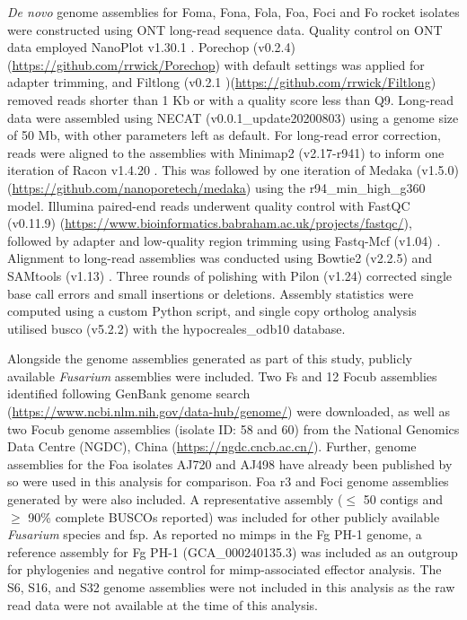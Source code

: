 \textit{De novo} genome assemblies for \ac{Foma}, \ac{Fona}, \ac{Fola}, \ac{Foa}, \ac{Foci} and \ac{Fo} rocket isolates were constructed using ONT long-read sequence data. Quality control on ONT data employed NanoPlot v1.30.1 \parencite{DeCoster2018}. Porechop (v0.2.4) (\href{https://github.com/rrwick/Porechop}{https://github.com/rrwic\-k/Porechop}) with default settings was applied for adapter trimming, and Filtlong (v0.2.1 )(\href{https://github.com/rrwick/Filtlong}{https://github.com/rrwick/Filtlong}) removed reads shorter than 1 Kb or with a quality score less than Q9. Long-read data were assembled using NECAT (v0.0.1\_update20200803) \parencite{Chen2021} using a genome size of 50 Mb, with other parameters left as default. For long-read error correction, reads were aligned to the assemblies with Minimap2 (v2.17-r941) \parencite{Li2018} to inform one iteration of Racon v1.4.20 \parencite{Vaser2017}. This was followed by one iteration of Medaka (v1.5.0) (\href{https://github.com/nanoporetech/medaka}{https://github.com/nanoporetech/medaka}) using the r94\_min\_high\_g360 model. Illumina paired-end reads underwent quality control with FastQC (v0.11.9) (\href{https://www.bioinformatics.babraham.ac.uk/projects/fastqc/}{https://www.bioinformatics.babraham.ac.uk/projects/fastqc/}), followed by adapter and low-quality region trimming using Fastq-Mcf (v1.04) \parencite{Aronesty2013}. Alignment to long-read assemblies was conducted using Bowtie2 (v2.2.5) \parencite{Langmead2012} and SAMtools (v1.13) \Parencite{Danecek2021}. Three rounds of polishing with Pilon (v1.24) \parencite{Walker2014} corrected single base call errors and small insertions or deletions. Assembly statistics were computed using a custom Python script, and single copy ortholog analysis utilised \ac{busco} (v5.2.2) \parencite{Simao2015} with the hypocreales\_odb10 database.

Alongside the genome assemblies generated as part of this study, publicly available \textit{Fusarium} assemblies were included. Two \ac{Fs} and 12 \ac{Focub} assemblies identified following GenBank genome search (\href{https://www.ncbi.nlm.nih.gov/data-hub/genome}{https://www.ncbi.nlm.nih.gov/data-hub/genome/}) were downloaded, as well as two \ac{Focub} genome assemblies (isolate ID: 58 and 60) from the National Genomics Data Centre (NGDC), China (\href{https://ngdc.cncb.ac.cn}{https://ngdc.cncb.ac.cn/}). Further, genome assemblies for the \ac{Foa} isolates AJ720 and AJ498 have already been published by \textcite{Henry2020} so were used in this analysis for comparison. \Ac{Foa} \ac{r3} and \ac{Foci} genome assemblies generated by \textcite{Henry2020} were also included. A representative assembly (\( \leq \) 50 contigs and \(\geq \) 90\% complete BUSCOs reported) was included for other publicly available \textit{Fusarium} species and \ac{fsp}. As \textcite{Schmidt2013} reported no \acp{mimp} in the \ac{Fg} PH-1 genome, a reference assembly for \ac{Fg} PH-1 (GCA\_000240135.3) was included as an outgroup for phylogenies and negative control for \ac{mimp}-associated effector analysis. The S6, S16, and S32 genome assemblies were not included in this analysis as the raw read data were not available at the time of this analysis.

